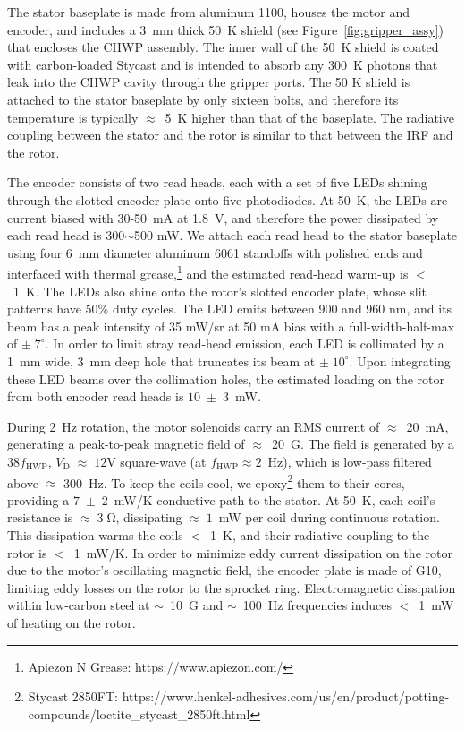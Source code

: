 The stator baseplate is made from aluminum 1100, houses the motor and encoder, and includes a 3~mm thick 50~K shield (see Figure~\ref{fig:gripper_assy}) that encloses the CHWP assembly. The inner wall of the 50~K shield is coated with carbon-loaded Stycast \cite{persky_review_1999} and is intended to absorb any 300~K photons that leak into the CHWP cavity through the gripper ports. The 50 K shield is attached to the stator baseplate by only sixteen bolts, and therefore its temperature is typically $\approx$~5~K higher than that of the baseplate. The radiative coupling between the stator and the rotor is similar to that between the IRF and the rotor.
 
The encoder consists of two read heads, each with a set of five LEDs shining through the slotted encoder plate onto five photodiodes. At 50~K, the LEDs are current biased with 30-50~mA at 1.8~V, and therefore the power dissipated by each read head is 300$\sim$500 mW. We attach each read head to the stator baseplate using four 6~mm diameter aluminum 6061 standoffs with polished ends and interfaced with thermal grease,\footnote{Apiezon N Grease: https://www.apiezon.com/} and the estimated read-head warm-up is $<$~1~K. The LEDs also shine onto the rotor's slotted encoder plate, whose slit patterns have 50\% duty cycles. The LED emits between 900 and 960 nm, and its beam has a peak intensity of 35 mW/sr at 50 mA bias with a full-width-half-max of $\pm \; 7^{\circ}$. In order to limit stray read-head emission, each LED is collimated by a 1~mm wide, 3~mm deep hole that truncates its beam at $\pm \; 10^{\circ}$. Upon integrating these LED beams over the collimation holes, the estimated loading on the rotor from both encoder read heads is $10 \; \pm \; 3$~mW.
 
During 2~Hz rotation, the motor solenoids carry an RMS current of $\approx$~20~mA, generating a peak-to-peak magnetic field of $\approx$~20~G. The field is generated by a 38$f_{\mathrm{HWP}}$, $V_{\mathrm{D}}\; \approx \; 12 \mathrm{V}$ square-wave (at $f_{\mathrm{HWP}} \approx 2$~Hz), which is low-pass filtered above $\approx$ 300~Hz. To keep the coils cool, we epoxy\footnote{Stycast 2850FT: https://www.henkel-adhesives.com/us/en/product/potting-compounds/loctite\_stycast\_2850ft.html} them to their cores, providing a $7 \; \pm \; 2$~mW/K conductive path to the stator. At 50~K, each coil's resistance is $\approx \; 3 \; \mathrm{\Omega}$, dissipating $\approx \; 1$~mW per coil during continuous rotation. This dissipation warms the coils $<$~1~K, and their radiative coupling to the rotor is $<$~1~mW/K. In order to minimize eddy current dissipation on the rotor due to the motor's oscillating magnetic field, the encoder plate is made of G10, limiting eddy losses on the rotor to the sprocket ring. Electromagnetic dissipation within low-carbon steel at $\sim$~10~G and $\sim$~100~Hz frequencies induces $<$~1~mW of heating on the rotor.

